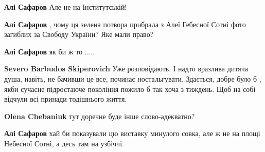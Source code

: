 \begin{itemize}
\begin{itemize}
\textbf{Алі Сафаров} Але не на Інститутській!

 
\textbf{Алі Сафаров} , чому ця зелена потвора прибрала з Алеї Гебесної Сотні фото загиблих за Свободу України? Яке мали право?

 
\textbf{Алі Сафаров} як би ж то .....

 
\textbf{Severo Barbudos Skiperovich} Уже розповідають. І надто вразлива дитяча душа, навіть, не бачивши це все, починає ностальгувати. Здається, добре було б , якби сучасне підростаюче покоління пожило б так хоча з тиждень. Щоб на собі відчули всі принади тодішнього життя.

 
\textbf{Olena Chebaniuk} тут доречне буде інше слово-адекватно?

 
\textbf{Алі Сафаров} хай би показували цю виставку минулого совка, але ж не на площі Небесної Сотні, а десь там на узбіччі.
\end{itemize}

\end{itemize}

